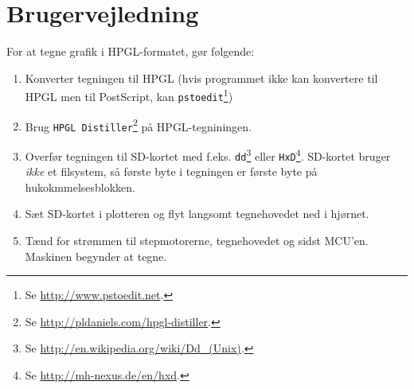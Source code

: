 \chapter{Brugervejledning}
\label{ch:brugervejledning}


For at tegne grafik i HPGL-formatet, gør følgende:

\begin{enumerate} \firmlist
\item Konverter tegningen til HPGL (hvis programmet ikke kan
  konvertere til HPGL men til PostScript, kan
  \texttt{pstoedit}\footnote{Se \url{http://www.pstoedit.net}.})
\item Brug \texttt{HPGL Distiller}\footnote{Se
    \url{http://pldaniels.com/hpgl-distiller}.} på HPGL-tegniningen.
\item Overfør tegningen til SD-kortet med
  f.eks. \texttt{dd}\footnote{Se
    \url{http://en.wikipedia.org/wiki/Dd_(Unix)}.} eller
  \texttt{HxD}\footnote{Se
    \url{http://mh-nexus.de/en/hxd}.}. SD-kortet bruger \textit{ikke}
  et filsystem, så første byte i tegningen er første byte på
  hukokmmelsesblokken.
\item Sæt SD-kortet i plotteren og flyt langsomt tegnehovedet ned i
  hjørnet.
\item Tænd for strømmen til stepmotorerne, tegnehovedet og sidst
  MCU'en. Maskinen begynder at tegne.
\end{enumerate}


